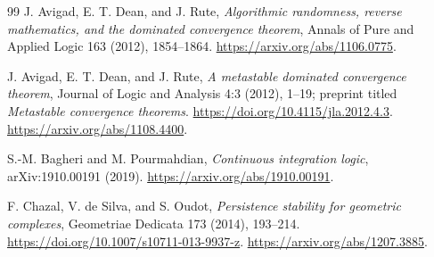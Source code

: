 \begin{thebibliography}{99}
J. Avigad, E. T. Dean, and J. Rute,
\emph{Algorithmic randomness, reverse mathematics, and the dominated
convergence theorem}, Annals of Pure and Applied Logic 163 (2012),
1854--1864. \url{https://arxiv.org/abs/1106.0775}.

J. Avigad, E. T. Dean, and J. Rute,
\emph{A metastable dominated convergence theorem}, Journal of Logic
and Analysis 4:3 (2012), 1--19; preprint titled
\emph{Metastable convergence theorems}.
\url{https://doi.org/10.4115/jla.2012.4.3}.
\url{https://arxiv.org/abs/1108.4400}.

S.-M. Bagheri and M. Pourmahdian,
\emph{Continuous integration logic}, arXiv:1910.00191 (2019).
\url{https://arxiv.org/abs/1910.00191}.

F. Chazal, V. de Silva, and S. Oudot,
\emph{Persistence stability for geometric complexes},
Geometriae Dedicata 173 (2014), 193--214.
\url{https://doi.org/10.1007/s10711-013-9937-z}.
\url{https://arxiv.org/abs/1207.3885}.
\end{thebibliography}

